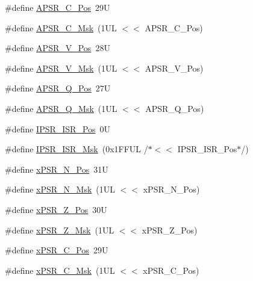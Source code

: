 \begin{DoxyCompactItemize}
\#define \hyperlink{group___c_m_s_i_s___c_o_r_e_ga6cf72aa6f09a168f9e5beda1a4a887b9}{A\+P\+S\+R\+\_\+\+C\+\_\+\+Pos}~29U
\item 
\#define \hyperlink{group___c_m_s_i_s___c_o_r_e_ga6d47803fbad455bc10bd1ce59f2f335d}{A\+P\+S\+R\+\_\+\+C\+\_\+\+Msk}~(1\+U\+L $<$$<$ A\+P\+S\+R\+\_\+\+C\+\_\+\+Pos)
\item 
\#define \hyperlink{group___c_m_s_i_s___c_o_r_e_gac62830f67679ccd11658c4172c3e6ea7}{A\+P\+S\+R\+\_\+\+V\+\_\+\+Pos}~28U
\item 
\#define \hyperlink{group___c_m_s_i_s___c_o_r_e_ga33305d6701356bff6890b315fe8b5489}{A\+P\+S\+R\+\_\+\+V\+\_\+\+Msk}~(1\+U\+L $<$$<$ A\+P\+S\+R\+\_\+\+V\+\_\+\+Pos)
\item 
\#define \hyperlink{group___c_m_s_i_s___c_o_r_e_ga298749e176f12827328bb7b92a6b2411}{A\+P\+S\+R\+\_\+\+Q\+\_\+\+Pos}~27U
\item 
\#define \hyperlink{group___c_m_s_i_s___c_o_r_e_ga90ffd4ec4149c2f5dd7747c1533fb002}{A\+P\+S\+R\+\_\+\+Q\+\_\+\+Msk}~(1\+U\+L $<$$<$ A\+P\+S\+R\+\_\+\+Q\+\_\+\+Pos)
\item 
\#define \hyperlink{group___c_m_s_i_s___c_o_r_e_ga0e34027584d02c43811ae908a5ca9adf}{I\+P\+S\+R\+\_\+\+I\+S\+R\+\_\+\+Pos}~0U
\item 
\#define \hyperlink{group___c_m_s_i_s___c_o_r_e_gaf013a4579a64d1f21f56ea9f1b33ab56}{I\+P\+S\+R\+\_\+\+I\+S\+R\+\_\+\+Msk}~(0x1\+F\+F\+U\+L /$\ast$$<$$<$ I\+P\+S\+R\+\_\+\+I\+S\+R\+\_\+\+Pos$\ast$/)
\item 
\#define \hyperlink{group___c_m_s_i_s___c_o_r_e_ga031eb1b8ebcdb3d602d0b9f2ec82a7ae}{x\+P\+S\+R\+\_\+\+N\+\_\+\+Pos}~31U
\item 
\#define \hyperlink{group___c_m_s_i_s___c_o_r_e_gaf600f4ff41b62cf2f3b0a59b6d2e93d6}{x\+P\+S\+R\+\_\+\+N\+\_\+\+Msk}~(1\+U\+L $<$$<$ x\+P\+S\+R\+\_\+\+N\+\_\+\+Pos)
\item 
\#define \hyperlink{group___c_m_s_i_s___c_o_r_e_ga5869dd608eea73c80f0567d781d2230b}{x\+P\+S\+R\+\_\+\+Z\+\_\+\+Pos}~30U
\item 
\#define \hyperlink{group___c_m_s_i_s___c_o_r_e_ga907599209fba99f579778e662021c4f2}{x\+P\+S\+R\+\_\+\+Z\+\_\+\+Msk}~(1\+U\+L $<$$<$ x\+P\+S\+R\+\_\+\+Z\+\_\+\+Pos)
\item 
\#define \hyperlink{group___c_m_s_i_s___c_o_r_e_ga14adb79b91f6634b351a1b57394e2db6}{x\+P\+S\+R\+\_\+\+C\+\_\+\+Pos}~29U
\item 
\#define \hyperlink{group___c_m_s_i_s___c_o_r_e_ga21e2497255d380f956ca0f48d11d0775}{x\+P\+S\+R\+\_\+\+C\+\_\+\+Msk}~(1\+U\+L $<$$<$ x\+P\+S\+R\+\_\+\+C\+\_\+\+Pos)

\end{DoxyCompactItemize}
